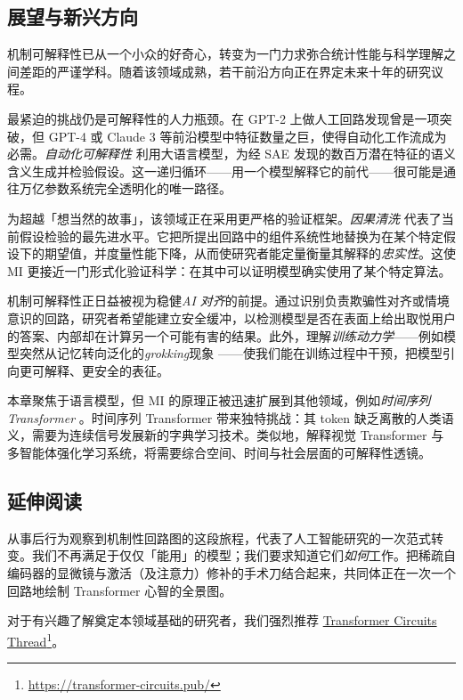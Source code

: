 \subsection{展望与新兴方向}

机制可解释性已从一个小众的好奇心，转变为一门力求弥合统计性能与科学理解之间差距的严谨学科。随着该领域成熟，若干前沿方向正在界定未来十年的研究议程。

最紧迫的挑战仍是可解释性的人力瓶颈。在 GPT-2 上做人工回路发现曾是一项突破，但 GPT-4 或 Claude 3 等前沿模型中特征数量之巨，使得自动化工作流成为必需。\emph{自动化可解释性} \citep{bills2023language} 利用大语言模型，为经 SAE 发现的数百万潜在特征的语义含义生成并检验假设。这一递归循环——用一个模型解释它的前代——很可能是通往万亿参数系统完全透明化的唯一路径。

为超越「想当然的故事」，该领域正在采用更严格的验证框架。\emph{因果清洗} \citep{chan2022causal} 代表了当前假设检验的最先进水平。它把所提出回路中的组件系统性地替换为在某个特定假设下的期望值，并度量性能下降，从而使研究者能定量衡量其解释的\emph{忠实性}。这使 MI 更接近一门形式化验证科学：在其中可以证明模型确实使用了某个特定算法。

机制可解释性正日益被视为稳健\emph{AI 对齐}的前提。通过识别负责欺骗性对齐或情境意识的回路，研究者希望能建立安全缓冲，以检测模型是否在表面上给出取悦用户的答案、内部却在计算另一个可能有害的结果。此外，理解\emph{训练动力学}——例如模型突然从记忆转向泛化的\emph{grokking}现象 \citep{nanda2023progress}——使我们能在训练过程中干预，把模型引向更可解释、更安全的表征。

本章聚焦于语言模型，但 MI 的原理正被迅速扩展到其他领域，例如\emph{时间序列 Transformer} \citep{kalnare2026}。时间序列 Transformer 带来独特挑战：其 token 缺乏离散的人类语义，需要为连续信号发展新的字典学习技术。类似地，解释视觉 Transformer 与多智能体强化学习系统，将需要综合空间、时间与社会层面的可解释性透镜。


\subsection{延伸阅读}
从事后行为观察到机制性回路图的这段旅程，代表了人工智能研究的一次范式转变。我们不再满足于仅仅「能用」的模型；我们要求知道它们\emph{如何}工作。把稀疏自编码器的显微镜与激活（及注意力）修补的手术刀结合起来，共同体正在一次一个回路地绘制 Transformer 心智的全景图。


\begin{tcolorbox}[
    colback=blue!10!white,
    colframe=blue!85!black,
    title={\faExclamationCircle\quad 延伸阅读},
    fonttitle=\bfseries,
    coltitle=white,
    boxrule=1pt,
    arc=4pt,
    left=5pt,
    right=5pt,
    top=5pt,
    bottom=5pt,
    enhanced
]
对于有兴趣了解奠定本领域基础的研究者，我们强烈推荐 \href{https://transformer-circuits.pub/}{Transformer Circuits Thread}\footnote{\url{https://transformer-circuits.pub/}}。
\end{tcolorbox}




